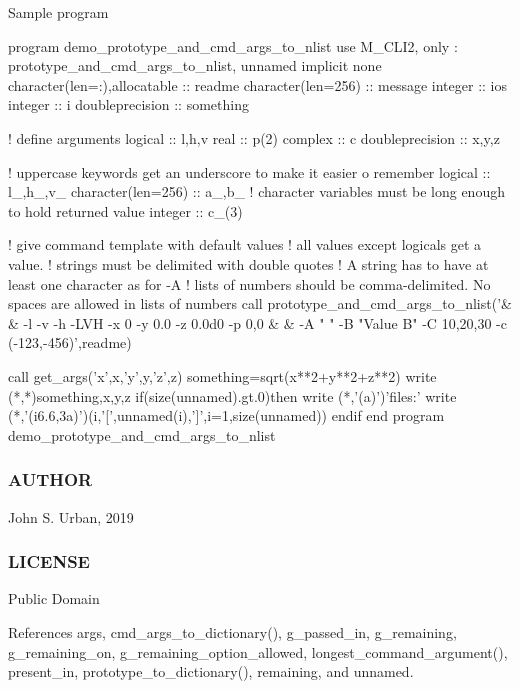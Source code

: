 Sample program \begin{DoxyVerb} program demo_prototype_and_cmd_args_to_nlist
 use M_CLI2,  only : prototype_and_cmd_args_to_nlist, unnamed
 implicit none
 character(len=:),allocatable :: readme
 character(len=256)           :: message
 integer                      :: ios
 integer                      :: i
 doubleprecision              :: something

 ! define arguments
 logical            :: l,h,v
 real               :: p(2)
 complex            :: c
 doubleprecision    :: x,y,z

 ! uppercase keywords get an underscore to make it easier o remember
 logical            :: l_,h_,v_
 character(len=256) :: a_,b_                  ! character variables must be long enough to hold returned value
 integer            :: c_(3)

    ! give command template with default values
    ! all values except logicals get a value.
    ! strings must be delimited with double quotes
    ! A string has to have at least one character as for -A
    ! lists of numbers should be comma-delimited. No spaces are allowed in lists of numbers
    call prototype_and_cmd_args_to_nlist('&
    & -l -v -h -LVH -x 0 -y 0.0 -z 0.0d0 -p 0,0 &
    & -A " " -B "Value B" -C 10,20,30 -c (-123,-456)',readme)

    call get_args('x',x,'y',y,'z',z)
       something=sqrt(x**2+y**2+z**2)
       write (*,*)something,x,y,z
       if(size(unnamed).gt.0)then
          write (*,'(a)')'files:'
          write (*,'(i6.6,3a)')(i,'[',unnamed(i),']',i=1,size(unnamed))
       endif
 end program demo_prototype_and_cmd_args_to_nlist
\end{DoxyVerb}
 \subsubsection*{A\+U\+T\+H\+OR}

John S. Urban, 2019 \subsubsection*{L\+I\+C\+E\+N\+SE}

Public Domain 

References args, cmd\+\_\+args\+\_\+to\+\_\+dictionary(), g\+\_\+passed\+\_\+in, g\+\_\+remaining, g\+\_\+remaining\+\_\+on, g\+\_\+remaining\+\_\+option\+\_\+allowed, longest\+\_\+command\+\_\+argument(), present\+\_\+in, prototype\+\_\+to\+\_\+dictionary(), remaining, and unnamed.

